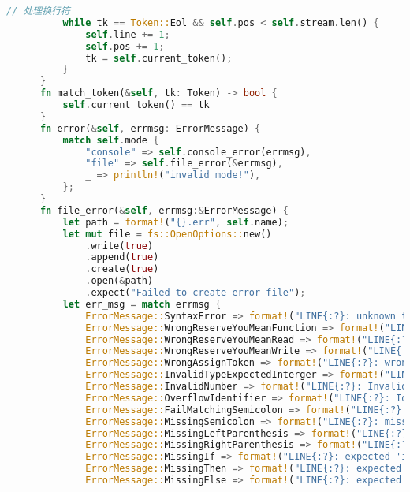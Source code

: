 \begin{lstlisting}[caption={语法分析器parse.rs}, label={4:code-example}, captionpos=t, language=rust]
          // 处理换行符
          while tk == Token::Eol && self.pos < self.stream.len() {
              self.line += 1;
              self.pos += 1;
              tk = self.current_token();
          }
      }
      fn match_token(&self, tk: Token) -> bool {
          self.current_token() == tk
      }
      fn error(&self, errmsg: ErrorMessage) {
          match self.mode {
              "console" => self.console_error(errmsg),
              "file" => self.file_error(&errmsg),
              _ => println!("invalid mode!"),
          };
      }
      fn file_error(&self, errmsg:&ErrorMessage) {
          let path = format!("{}.err", self.name);
          let mut file = fs::OpenOptions::new()
              .write(true)
              .append(true)
              .create(true)
              .open(&path)
              .expect("Failed to create error file");
          let err_msg = match errmsg {
              ErrorMessage::SyntaxError => format!("LINE{:?}: unknown token!\n", self.line),
              ErrorMessage::WrongReserveYouMeanFunction => format!("LINE{:?}: wrong reserve: you mean 'function'?\n", self.line),
              ErrorMessage::WrongReserveYouMeanRead => format!("LINE{:?}: wrong reserve: you mean 'read'?\n", self.line),
              ErrorMessage::WrongReserveYouMeanWrite => format!("LINE{:?}: wrong reserve: you mean 'write'?\n", self.line),
              ErrorMessage::WrongAssignToken => format!("LINE{:?}: wrong assign operator: you mean ':='?\n", self.line),
              ErrorMessage::InvalidTypeExpectedInterger => format!("LINE{:?}: invalid type: expected INTEGER\n", self.line),
              ErrorMessage::InvalidNumber => format!("LINE{:?}: Invalid number!\n", self.line),
              ErrorMessage::OverflowIdentifier => format!("LINE{:?}: Identifier length overflow!\n", self.line),
              ErrorMessage::FailMatchingSemicolon => format!("LINE{:?}: Semicolon matching failed!\n", self.line),
              ErrorMessage::MissingSemicolon => format!("LINE{:?}: missing a ';' at the end of the statement\n", self.line),
              ErrorMessage::MissingLeftParenthesis => format!("LINE{:?}: expected '(' following the function statement\n", self.line),
              ErrorMessage::MissingRightParenthesis => format!("LINE{:?}: expected ')' to cover the block\n", self.line),
              ErrorMessage::MissingIf => format!("LINE{:?}: expected 'if' \n", self.line),
              ErrorMessage::MissingThen => format!("LINE{:?}: expected 'then' \n", self.line),
              ErrorMessage::MissingElse => format!("LINE{:?}: expected 'else' \n", self.line),

\end{lstlisting}
